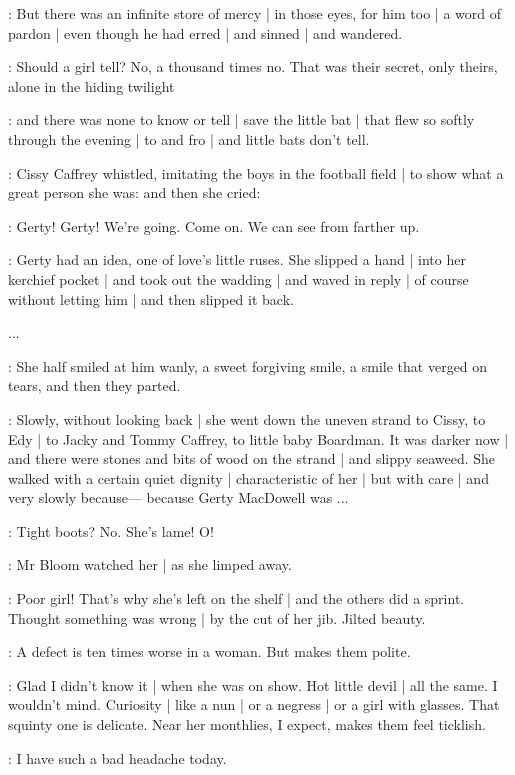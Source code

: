 :
But there was an infinite store of mercy |
in those eyes,
for him too |
a word of pardon |
even though he had erred |
and sinned |
and wandered.

\gertyNovel:
Should a girl tell?%
No,
a thousand times no.
That was their secret,
only theirs,
alone in the hiding twilight

:
and there was none to know or tell |
save the little bat |
that flew so softly through the evening |
to and fro |
and little bats don't tell.

:
Cissy Caffrey whistled,
imitating the boys in the football field |
to show what a great person she was:
and then she cried:

\cissy:
Gerty!
Gerty!
We're going.
Come on.
We can see from farther up.

\gertyNovel:
Gerty had an idea,
one of love's little ruses.
She slipped a hand |
into her kerchief pocket |
and took out the wadding |
and waved in reply |
of course 
without letting him |
and then slipped it back.

...

\gertyNovel:
She half smiled at him wanly,
a sweet forgiving smile,
a smile that verged on tears,
and then they parted.

:
Slowly,
without looking back |
she went down the uneven strand to Cissy,
to Edy |
to Jacky and Tommy Caffrey,
to little baby Boardman.
It was darker now |
and there were stones and bits of wood on the strand |
and slippy seaweed.
She walked with a certain quiet dignity |
characteristic of her |
but with care |%
and very slowly because—%
because Gerty MacDowell was ...

\BloomInt:
Tight boots?
No.
She's lame!
O!

:
Mr Bloom watched her |
as she limped away.

\BloomCurrent:
Poor girl!
That's why
she's left on the shelf |
and the others did a sprint.
Thought something was wrong |
by the cut of her jib.
Jilted beauty.

\BloomAbstract:
A defect is ten times worse in a woman.
But makes them polite.

\BloomCurrent:
Glad I didn't know it |
when she was on show.
Hot little devil |
all the same.
I wouldn't mind.
Curiosity |
like a nun |
or a negress |
or a girl with glasses.
That squinty one is delicate.
Near her monthlies,
I expect,
makes them feel ticklish.

\BloomOther:
I have such a bad headache today.


